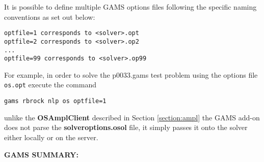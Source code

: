 \documentclass[11pt]{article}
\renewcommand{\{}{{\char"7B}}
\renewcommand{\}}{{\char"7D}}
\renewcommand{\^}{{\char"0D}}
\renewcommand{\'}{{\char"0D}}
\begin{document}
It is possible to define multiple GAMS options files following the  specific naming conventions as set out below:

\begin{verbatim}
optfile=1 corresponds to <solver>.opt
optfile=2 corresponds to <solver>.op2
...
optfile=99 corresponds to <solver>.op99
\end{verbatim}

For example, in order to solve the p0033.gams  test problem using the  options file  {\tt os.opt}
execute the command

\begin{verbatim}
gams rbrock nlp os optfile=1
\end{verbatim}

 unlike the {\bf OSAmplClient} described in Section \ref{section:ampl}  the GAMS add-on does not parse the {\bf solveroptions.osol} file, it simply passes it onto the solver either locally or on the server.
\vskip 10pt


{\bf GAMS SUMMARY:}
\end{document}

